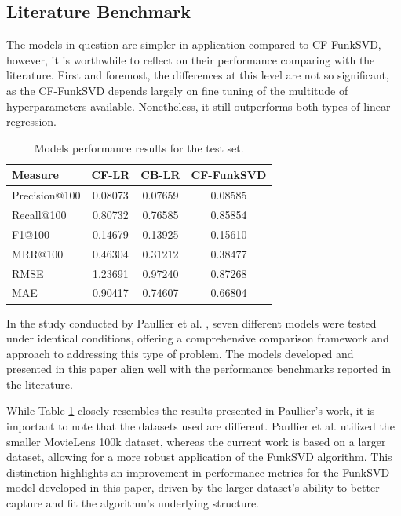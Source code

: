 \documentclass[conference]{IEEEtran}
\begin{document}
\subsection{Literature Benchmark}

The models in question are simpler in application compared to CF-FunkSVD, however, it is worthwhile to reflect on their performance comparing with the literature. First and foremost, the differences at this level are not so significant, as the CF-FunkSVD depends largely on fine tuning of the multitude of hyperparameters available. Nonetheless, it still outperforms both types of linear regression.

\begin{table}[H]
\centering
\caption{Models performance results for the test set.}
\label{tab:atk_results_benchamarkpaper}
\begin{tabular}{lccc}
\toprule
\textbf{Measure} & \textbf{CF-LR} & \textbf{CB-LR} & \textbf{CF-FunkSVD} \\
\midrule
Precision@100 & 0.08073 & 0.07659 & 0.08585 \\
Recall@100 & 0.80732 & 0.76585 & 0.85854 \\
F1@100 & 0.14679 & 0.13925 & 0.15610 \\
MRR@100 & 0.46304 & 0.31212 & 0.38477 \\
RMSE & 1.23691 & 0.97240 & 0.87268 \\
MAE & 0.90417 & 0.74607 & 0.66804 \\
\bottomrule
\end{tabular}
\end{table}

In the study conducted by Paullier et al. \cite{9379914}, seven different models were tested under identical conditions, offering a comprehensive comparison framework and approach to addressing this type of problem. The models developed and presented in this paper align well with the performance benchmarks reported in the literature.

While Table \ref{tab:atk_results_benchamarkpaper} closely resembles the results presented in Paullier’s work, it is important to note that the datasets used are different. Paullier et al. utilized the smaller MovieLens 100k dataset, whereas the current work is based on a larger dataset, allowing for a more robust application of the FunkSVD algorithm. This distinction highlights an improvement in performance metrics for the FunkSVD model developed in this paper, driven by the larger dataset’s ability to better capture and fit the algorithm's underlying structure.
\end{document}
